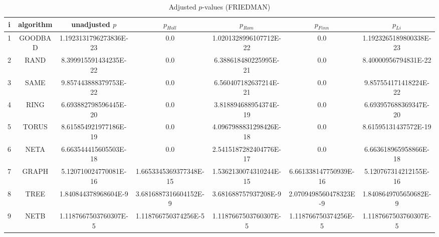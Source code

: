 \documentclass[a4paper,10pt]{article}
\begin{document}
\begin{landscape}
\begin{table}[!htp]
\centering\scriptsize
\caption{Adjusted $p$-values (FRIEDMAN)}
\begin{tabular}{ccccccc}
i&algorithm&unadjusted $p$&$p_{Holl}$&$p_{Rom}$&$p_{Finn}$&$p_{Li}$\\
\hline
1& GOODBAD&1.1923131796273836E-23&0.0&1.0201328996107712E-22&0.0&1.1923265189800338E-23\\
2& RAND&8.399915591434235E-22&0.0&6.388618480225995E-21&0.0&8.40000956794831E-22\\
3& SAME&9.857443888379753E-22&0.0&6.560407182637214E-21&0.0&9.857554171418224E-22\\
4& RING&6.693882798596445E-20&0.0&3.818894688954374E-19&0.0&6.693957688369347E-20\\
5& TORUS&8.615854921977186E-19&0.0&4.0967988831298426E-18&0.0&8.61595131437572E-19\\
6& NETA&6.663544415605503E-18&0.0&2.5415187282404776E-17&0.0&6.663618965958866E-18\\
7& GRAPH&5.120710024770081E-16&1.6653345369377348E-15&1.5362130074310244E-15&6.661338147750939E-16&5.120767314212155E-16\\
8& TREE&1.840844378968604E-9&3.6816887316604152E-9&3.681688757937208E-9&2.0709498560478323E-9&1.8408649705650682E-9\\
9& NETB&1.1187667503760307E-5&1.118766750374256E-5&1.1187667503760307E-5&1.118766750374256E-5&1.1187667503760307E-5\\
\hline
\end{tabular}
\end{table}


\newpage


\end{landscape}
\end{document}

